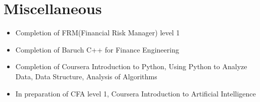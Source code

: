 \documentclass{resume}
\newcommand{\en}[1]{#1}
\newcommand{\zh}[1]{}
\begin{document}
\section{\en{Miscellaneous}\zh{证书}}
\begin{itemize}
      \item \en{Completion of FRM(Financial Risk Manager) level 1}
            \zh{金融风险管理师从业一级通过。}
            \vspace{2 mm}
      \item \en{Completion of Baruch C++ for Finance Engineering}
            \zh{巴塞尔大学C++金融工程课程通过。}
            \vspace{2 mm}
      \item \en{Completion of Coursera Introduction to Python, Using Python to Analyze Data, Data Structure, Analysis of Algorithms}
            \zh{Coursera Python入门、Python数据分析、数据结构、算法分析课程通过。}
            \vspace{2 mm}
      \item \en{In preparation of CFA level 1, Coursera Introduction to Artificial Intelligence}
            \zh{CFA一级考试准备中。学习Coursera AI入门课程。}
            \vspace{2 mm}
\end{itemize}
\end{document}

